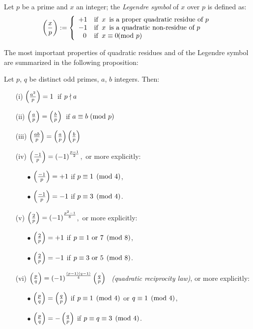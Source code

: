 \begin{defnen}
Let\/ $p$\/ be a prime and\/ $x$\/ an integer; the\/
\emph{Legendre symbol\/} of\/ $x$\/ over\/ $p$\/ is defined as:
\begin{equation*}
\left(\frac{x}{p}\right) :=
\left\{ \begin{array}{ll}
 +1 & \textrm{if \:} x \textrm{\, is a proper quadratic residue of } p\\
 -1 & \textrm{if \:} x \textrm{\, is a quadratic non-residue of } p\\
~~0 & \textrm{if \:} x \equiv 0\!\!\! \pmod p\\
\end{array}
\right.
\end{equation*}
\end{defnen}

The most important properties of quadratic residues and of the Legendre
symbol are summarized in the following proposition:
\begin{thmen}
Let $p$, $q$ be distinct odd primes, $a$, $b$ integers. Then:
\begin{itemize}
 \item[{\rm (i)\;}]
   $\left(\frac{a^2}{p}\right) = 1$\, if $p \nmid a$
 \item[{\rm (ii)\;}]
   $\left(\frac{a}{p}\right) = \left(\frac{b}{p}\right)$\, if\/ $a \equiv b\! \pmod p$
 \item[{\rm (iii)\;}]
   $\left(\frac{ab}{p}\right) = \left(\frac{a}{p}\right) \left(\frac{b}{p}\right)$
 \item[{\rm (iv)\;}]
   $\left(\frac{-1}{p}\right) = {(-1)}^{\frac{p-1}{2}}$,\, or more explicitly:
   \begin{itemize}
     \item[$\bullet$]
       $\left(\frac{-1}{p}\right) = +1$\/ if\/ $p \equiv 1 \pmod 4$,
     \item[$\bullet$]
       $\left(\frac{-1}{p}\right) = -1$\/ if\/ $p \equiv 3 \pmod 4$.
   \end{itemize}
\item[{\rm (v)\;}]
   $\left(\frac{2}{p}\right) = {(-1)}^{\frac{p^2-1}{8}}$,\, or more explicitly:
   \begin{itemize}
     \item[$\bullet$]
        $\left(\frac{2}{p}\right) = +1$\/ if\/ $p \equiv 1\textrm{ or }7 \pmod 8$,
     \item[$\bullet$]
        $\left(\frac{2}{p}\right) = -1$\/ if\/ $p \equiv 3\textrm{ or }5 \pmod 8$.
   \end{itemize}
\item[{\rm (vi)\;}]
   $\left(\frac{p}{q}\right) = {(-1)}^{\frac{(p-1)(q-1)}{4}}\left(\frac{q}{p}\right)$
   \ \:\emph{(quadratic reciprocity law)},\; or more explicitly:
  \begin{itemize}
     \item[$\bullet$]
        $\left(\frac{p}{q}\right) = \left(\frac{q}{p}\right)$\/ if\/ $p \equiv 1 \pmod 4$\/ or\/ 
          $q \equiv 1 \pmod 4$,
     \item[$\bullet$]
        $\left(\frac{p}{q}\right) = -\left(\frac{q}{p}\right)$\/ if\/
          $p \equiv q \equiv 3 \pmod 4$.
  \end{itemize}
\end{itemize}

\end{thmen}

